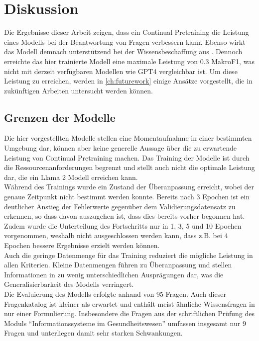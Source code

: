 \chapter{Diskussion}\label{ch:discussion}
Die Ergebnisse dieser Arbeit zeigen, dass ein Continual Pretraining die Leistung eines Modells bei der Beantwortung von Fragen verbessern kann. Ebenso wirkt das Modell demnach unterstützend bei der Wissensbeschaffung aus \citet{bb}.
Dennoch erreichte das hier trainierte Modell eine maximale Leistung von \num{0.3} MakroF1, was nicht mit derzeit verfügbaren Modellen wie GPT4 vergleichbar ist.
Um diese Leistung zu erreichen, werden in \cref{ch:futurework} einige Ansätze vorgestellt, die in zukünftigen Arbeiten untersucht werden können.

\section{Grenzen der Modelle}
Die hier vorgestellten Modelle stellen eine Momentaufnahme in einer bestimmten Umgebung dar, können aber keine generelle Aussage über die zu erwartende Leistung von Continual Pretraining machen.
Das Training der Modelle ist durch die Ressourcenanforderungen begrenzt und stellt auch nicht die optimale Leistung dar, die ein Llama 2 Modell erreichen kann.\\

Während des Trainings wurde ein Zustand der Überanpassung erreicht, wobei der genaue Zeitpunkt nicht bestimmt werden konnte.
Bereits nach 3 Epochen ist ein deutlicher Anstieg der Fehlerwerte gegenüber dem Validierungsdatensatz zu erkennen, so dass davon auszugehen ist, dass dies bereits vorher begonnen hat.
Zudem wurde die Unterteilung des Fortschritts nur in 1, 3, 5 und 10 Epochen vorgenommen, weshalb nicht ausgeschlossen werden kann, dass z.B. bei 4 Epochen bessere Ergebnisse erzielt werden können.\\

Auch die geringe Datenmenge für das Training reduziert die mögliche Leistung in allen Kriterien.
Kleine Datenmengen führen zu Überanpassung und stellen Informationen in zu wenig unterschiedlichen Ausprägungen dar, was die Generalisierbarkeit des Modells verringert.\\

Die Evaluierung des Modells erfolgte anhand von \num{95} Fragen.
Auch dieser Fragenkatalog ist kleiner als erwartet und enthält meist ähnliche Wissensfragen in nur einer Formulierung.
Insbesondere die Fragen aus der schriftlichen Prüfung des Moduls \enquote{Informationssysteme im Gesundheitswesen} umfassen insgesamt nur 9 Fragen und unterliegen damit sehr starken Schwankungen.\\

